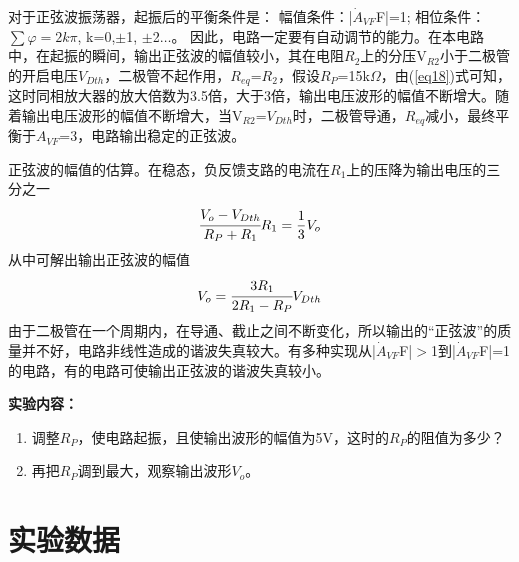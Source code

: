 \documentclass[a4paper]{article}
\begin{document}
对于正弦波振荡器，起振后的平衡条件是：
幅值条件：|$\dot{A}_{VF}$F|=1; 
相位条件：$\sum\varphi = 2k\pi$, k=0,$\pm$1, $\pm$2$\dots$。
因此，电路一定要有自动调节的能力。在本电路中，在起振的瞬间，输出正弦波的幅值较小，其在电阻$R_2$上的分压V$_{R2}$小于二极管的开启电压$V_{Dth}$，二极管不起作用，$R_{eq}$=$R_2$，假设$R_P$=15k$\Omega$，由(\ref{eq18})式可知，这时同相放大器的放大倍数为3.5倍，大于3倍，输出电压波形的幅值不断增大。随着输出电压波形的幅值不断增大，当V$_{R2}$=$V_{Dth}$时，二极管导通，$R_{eq}$减小，最终平衡于$A_{VF}$=3，电路输出稳定的正弦波。

正弦波的幅值的估算。在稳态，负反馈支路的电流在$R_1$上的压降为输出电压的三分之一
\begin{equation*}
\cfrac{V_o - V_{Dth}}{R_P+R_1}R_1 = \frac13V_o
\end{equation*}
从中可解出输出正弦波的幅值
\begin{equation*}
V_o = \cfrac{3R_1}{2R_1 - R_P}V_{Dth}
\end{equation*}
由于二极管在一个周期内，在导通、截止之间不断变化，所以输出的“正弦波”的质量并不好，电路非线性造成的谐波失真较大。有多种实现从|$\dot{A}_{VF}$F|$>$1到|$\dot{A}_{VF}$F|=1的电路，有的电路可使输出正弦波的谐波失真较小。

\textbf{实验内容：}
\begin{enumerate}
\item 调整$R_P$，使电路起振，且使输出波形的幅值为5V，这时的$R_P$的阻值为多少？
\item 再把$R_P$调到最大，观察输出波形$V_o$。
\end{enumerate}

\section{实验数据}
\end{document}

